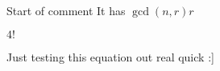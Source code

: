                                                                                                                                     



Start of comment  It has $\gcd(n, r) r$

$4!$

Just testing this equation out real quick :]






